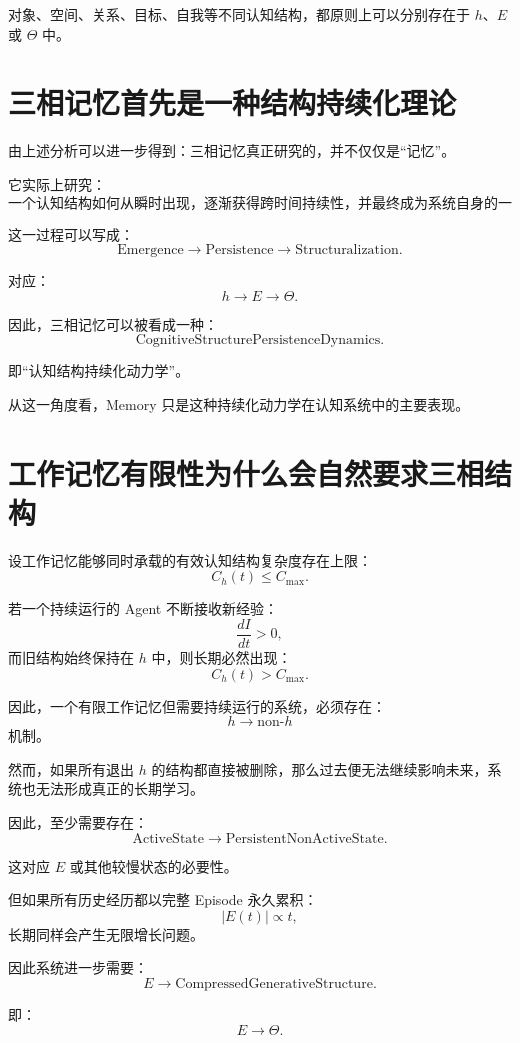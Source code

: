 对象、空间、关系、目标、自我等不同认知结构，都原则上可以分别存在于 $h$、$E$ 或 $\Theta$ 中。

\section{三相记忆首先是一种结构持续化理论}

由上述分析可以进一步得到：三相记忆真正研究的，并不仅仅是“记忆”。

它实际上研究：
\[
\boxed{
\text{一个认知结构如何从瞬时出现，逐渐获得跨时间持续性，并最终成为系统自身的一部分。}
}
\]

这一过程可以写成：
\[
\boxed{
\text{Emergence}
\rightarrow
\text{Persistence}
\rightarrow
\text{Structuralization}.
}
\]

对应：
\[
\boxed{
h
\rightarrow
E
\rightarrow
\Theta.
}
\]

因此，三相记忆可以被看成一种：
\[
\boxed{
\text{CognitiveStructurePersistenceDynamics}.
}
\]

即“认知结构持续化动力学”。

从这一角度看，Memory 只是这种持续化动力学在认知系统中的主要表现。

\section{工作记忆有限性为什么会自然要求三相结构}

设工作记忆能够同时承载的有效认知结构复杂度存在上限：
\[
C_h(t)\le C_{\max}.
\]

若一个持续运行的 Agent 不断接收新经验：
\[
\frac{dI}{dt}>0,
\]
而旧结构始终保持在 $h$ 中，则长期必然出现：
\[
C_h(t)>C_{\max}.
\]

因此，一个有限工作记忆但需要持续运行的系统，必须存在：
\[
\boxed{
h\rightarrow\text{non-}h
}
\]
机制。

然而，如果所有退出 $h$ 的结构都直接被删除，那么过去便无法继续影响未来，系统也无法形成真正的长期学习。

因此，至少需要存在：
\[
\boxed{
\text{ActiveState}
\rightarrow
\text{PersistentNonActiveState}.
}
\]

这对应 $E$ 或其他较慢状态的必要性。

但如果所有历史经历都以完整 Episode 永久累积：
\[
|E(t)|\propto t,
\]
长期同样会产生无限增长问题。

因此系统进一步需要：
\[
\boxed{
E
\rightarrow
\text{CompressedGenerativeStructure}.
}
\]

即：
\[
\boxed{
E\rightarrow\Theta.
}
\]

